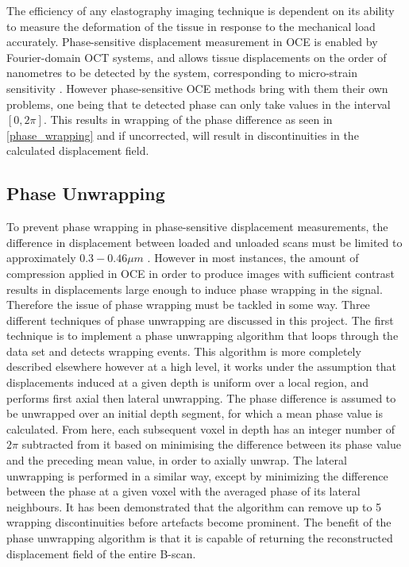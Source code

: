 The efficiency of any elastography imaging technique is dependent on its ability to measure the deformation of the tissue in response to the mechanical load accurately. Phase-sensitive displacement measurement in OCE is enabled by Fourier-domain OCT systems, and allows tissue displacements on the order of nanometres to be detected by the system, corresponding to micro-strain sensitivity \cite{kennedy_review_2014}. However phase-sensitive OCE methods bring with them their own problems, one being that te detected phase can only take values in the interval $[0,2\pi]$. This results in wrapping of the phase difference as seen in \autoref{phase_wrapping} and if uncorrected, will result in discontinuities in the calculated displacement field.

\subsection{Phase Unwrapping}
To prevent phase wrapping in phase-sensitive displacement measurements, the difference in displacement between loaded and unloaded scans must be limited to approximately $0.3-0.46\mu m$ \cite{kennedy_optical_2014}. However in most instances, the amount of compression applied in OCE in order to produce images with sufficient contrast results in displacements large enough to induce phase wrapping in the signal. Therefore the issue of phase wrapping must be tackled in some way. Three different techniques of phase unwrapping are discussed in this project. The first technique is to implement a phase unwrapping algorithm that loops through the data set and detects wrapping events. This algorithm is more completely described elsewhere \cite{kennedy_optical_2014} however at a high level, it works under the assumption that displacements induced at a given depth is uniform over a local region, and performs first axial then lateral unwrapping. The phase difference is assumed to be unwrapped over an initial depth segment, for which a mean phase value is calculated. From here, each subsequent voxel in depth has an integer number of $2\pi$ subtracted from it based on minimising the difference between its phase value and the preceding mean value, in order to axially unwrap. The lateral unwrapping is performed in a similar way, except by minimizing the difference between the phase at a given voxel with the averaged phase of its lateral neighbours. It has been demonstrated that the algorithm can remove up to 5 wrapping discontinuities \cite{kennedy_optical_2014} before artefacts become prominent.
The benefit of the phase unwrapping algorithm is that it is capable of returning the reconstructed displacement field of the entire B-scan. 


